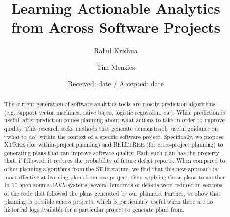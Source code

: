 \documentclass[smallextended]{svjour3}       %
\begin{document}
\title{Learning Actionable Analytics from Across Software Projects}


\author{Rahul Krishna         \and
        Tim Menzies %
}



\date{Received: date / Accepted: date}


\maketitle

\begin{abstract}
The current generation of software analytics tools are mostly prediction algorithms (e.g. support vector machines, naive
bayes, logistic regression, etc). While prediction is useful, after prediction comes planning about what actions to take in order to
improve quality. This research seeks methods that generate demonstrably useful guidance on “what to do” within the context of a
specific software project. Specifically, we propose XTREE (for within-project planning) and BELLTREE (for cross-project planning) to
generating plans that can improve software quality. Each such plan has the property that, if followed, it reduces the probability of future
defect reports. When compared to other planning algorithms from the SE literature, we find that this new approach is most effective at
learning plans from one project, then applying those plans to another. In 10 open-source JAVA systems, several hundreds of defects
were reduced in sections of the code that followed the plans generated by our planners. Further, we show that planning is possible
across projects, which is particularly useful when there are no historical logs available for a particular project to generate plans from.
\end{abstract}
\end{document}
